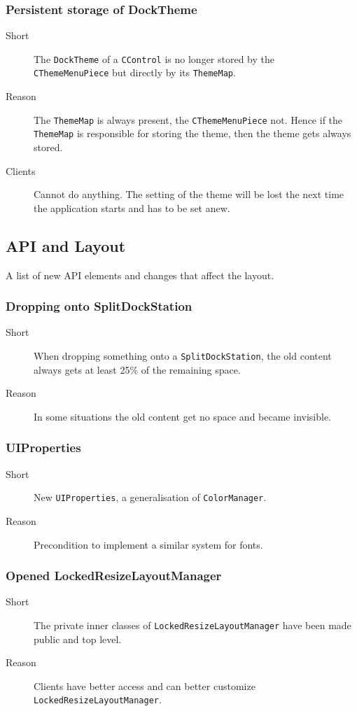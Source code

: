 \documentclass[a4paper,10pt]{article}
\newcommand{\src}[1]{\lstinline[basicstyle=\normalsize\ttfamily,keywordstyle=\normalsize\ttfamily,identifierstyle=\normalsize\ttfamily]|#1|}
\newcommand{\short}{\item[Short]}
\newcommand{\why}{\item[Reason]}
\newcommand{\clients}{\item[Clients]}
\begin{document}
\subsubsection{Persistent storage of DockTheme}
\begin{description}
 \short The \src{DockTheme} of a \src{CControl} is no longer stored by the \\\src{CThemeMenuPiece} but directly by its \src{ThemeMap}.
 \why The \src{ThemeMap} is always present, the \src{CThemeMenuPiece} not. Hence if the \src{ThemeMap} is responsible for storing the theme, then the theme gets always stored.
 \clients Cannot do anything. The setting of the theme will be lost the next time the application starts and has to be set anew.
\end{description}



\subsection{API and Layout}
A list of new API elements and changes that affect the layout.

\subsubsection{Dropping onto SplitDockStation}
\begin{description}
 \short When dropping something onto a \src{SplitDockStation}, the old content always gets at least 25\% of the remaining space.
 \why In some situations the old content get no space and became invisible.
\end{description}

\subsubsection{UIProperties}
\begin{description}
 \short New \src{UIProperties}, a generalisation of \src{ColorManager}.
 \why Precondition to implement a similar system for fonts.
\end{description}

\subsubsection{Opened LockedResizeLayoutManager}
\begin{description}
 \short The private inner classes of \src{LockedResizeLayoutManager} have been made public and top level.
 \why Clients have better access and can better customize \\\src{LockedResizeLayoutManager}.
\end{description}
\end{document}
